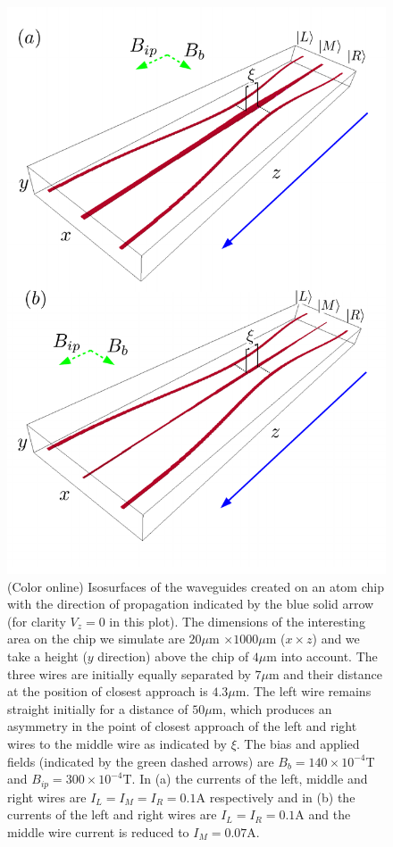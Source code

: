 \begin{figure}
  \includegraphics[width=\linewidth]{ch2_numerics/3D2.pdf}
  \caption{(Color online) Isosurfaces of the waveguides created on an atom chip with the direction of propagation indicated by the blue solid arrow (for clarity $V_z=0$ in this plot). The dimensions of the interesting area on the chip we simulate are $20\mu$m $\times 1000\mu$m ($x \times z$) and we take a height ($y$ direction) above the chip of $4\mu$m into account. The three wires are initially equally separated by $7\mu$m and their distance at the position of closest approach is $4.3\mu$m. The left wire remains straight initially for a distance of $50\mu$m, which produces an asymmetry in the point of closest approach of the left and right wires to the middle wire as indicated by $\xi$. The bias and applied fields (indicated by the green dashed arrows) are $B_b=140 \times 10^{-4}$T and $B_{ip}=300 \times 10^{-4} $T. In (a) the currents of the left, middle and right wires are $I_L=I_M=I_R=0.1$A respectively and in (b) the currents of the left and right wires are $I_L=I_R=0.1$A and the middle wire current is reduced to $I_M=0.07$A.}
      \label{fig:Potentials}
\end{figure}

